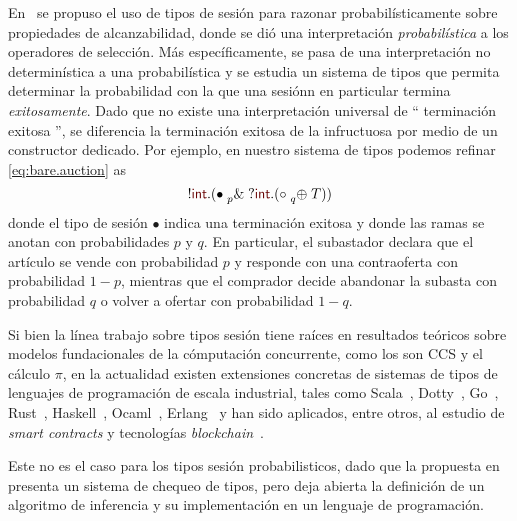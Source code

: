 \documentclass{article}
\newcommand{\mktype}[1]{\mathsf{\color{myred}#1}}
\newcommand{\tint}{\mktype{int}}
\newcommand{\parens}[1]{(#1)}
\newcommand{\tdone}{{\bullet}}
\newcommand{\tend}{{\circ}}
\newcommand{\cin}[2][.]{{?}#2#1}
\newcommand{\cout}[2][.]{{!}#2#1}
\newcommand{\xpoint}[3]{#1 \mathrel{#2} #3}
\newcommand{\tbranch}[3][p]{\xpoint{#2}{\prescript{}{#1}{\&}}{#3}}
\newcommand{\tchoice}[3][p]{\xpoint{#2}{\prescript{}{#1}{\oplus}}{#3}}
\newcommand{\T}{T}
\begin{document}
En~\cite{DBLP:conf/concur/InversoMPTT20} se propuso el uso de tipos de sesi\'on para
razonar probabil\'isticamente sobre propiedades de alcanzabilidad, donde se di\'o
 una interpretaci\'on
\emph{probabil\'istica} a los operadores de selecci\'on. M\'as específicamente, se pasa 
 de una interpretación no determin\'istica a una probabilística y se 
 estudia un sistema de tipos que permita determinar la probabilidad con la que una sesi\'onn en particular
termina \emph{exitosamente}. Dado que no existe una interpretaci\'on universal
 de `` terminación exitosa '', se diferencia la terminaci\'on exitosa de la 
 infructuosa  por medio de un
  {constructor dedicado}.
%
Por ejemplo, en nuestro sistema de tipos podemos refinar
\eqref{eq:bare.auction} as
\begin{equation}
  \label{eq:refined.auction}
  \cout\tint\parens{
    \tbranch[p]\tdone{
      \cin\tint\parens{
        \tchoice[q]\tend\T
      }
    }
  }
\end{equation}
donde el tipo de sesión $\tdone$ indica una terminación exitosa y donde las
ramas  se anotan con probabilidades $p$ y
$q$. En particular, el subastador declara que el artículo se vende con
probabilidad $p$ y  responde con una contraoferta con probabilidad
$1-p$, mientras que el comprador decide abandonar la subasta con
probabilidad $q$ o volver a ofertar  con probabilidad $1-q$.

Si bien la l\'inea trabajo sobre tipos sesi\'on tiene ra\'ices en resultados te\'oricos
sobre modelos fundacionales de la c\'omputaci\'on concurrente, como
los son CCS y el c\'alculo $\pi$, en la actualidad existen extensiones
concretas de sistemas de tipos de lenguajes de programaci\'on de
escala industrial, tales como Scala~\cite{DBLP:conf/pldi/ScalasYB19}, Dotty~\cite{DBLP:conf/pldi/ScalasYB19}, Go~\cite{DBLP:conf/icse/LangeNTY18,DBLP:conf/icse/LangeNTY18}, Rust~\cite{DBLP:journals/corr/abs-1909-05970,DBLP:conf/coordination/LagaillardieNY20}, Haskell~\cite{orchard2017session,DBLP:conf/haskell/LindleyM16}, 
Ocaml~\cite{DBLP:journals/jfp/Padovani17,DBLP:conf/coordination/LagaillardieNY20,DBLP:conf/ecoop/ImaiNYY19}, Erlang~\cite{fowler2016erlang} y han sido aplicados, entre otros, 
al estudio de  {\em smart contracts} y tecnolog\'ias {\em blockchain}~\cite{10.1145/3417516,DBLP:journals/corr/abs-1902-06056}. 

Este no es el caso para los tipos sesi\'on probabilisticos, dado que
 la propuesta en~\cite{DBLP:conf/concur/InversoMPTT20} presenta un sistema de chequeo 
de tipos, pero deja abierta la definici\'on de un algoritmo de inferencia y su implementaci\'on 
en un lenguaje de programaci\'on.
\end{document}
